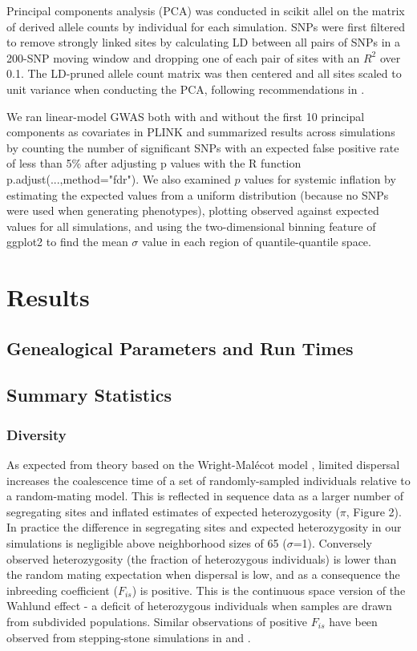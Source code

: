 \documentclass[9pt,twocolumn,twoside,lineno]{gsajnl}
\begin{document}
Principal components analysis (PCA) was conducted in scikit allel on the matrix of derived allele counts by individual for each simulation. SNPs were first filtered to remove strongly linked sites by calculating LD between all pairs of SNPs in a 200-SNP moving window and dropping one of each pair of sites with an $R^2$ over 0.1. The LD-pruned allele count matrix was then centered and all sites scaled to unit variance when conducting the PCA, following recommendations in \citep{Patterson2006}.   

We ran linear-model GWAS both with and without the first 10 principal components as covariates in PLINK and summarized results across simulations by counting the number of significant SNPs with an expected false positive rate of less than 5\% after adjusting p values with the R function p.adjust(...,method="fdr"). We also examined $p$ values for systemic inflation by estimating the expected values from a uniform distribution (because no SNPs were used when generating phenotypes), plotting observed against expected values for all simulations, and using the two-dimensional binning feature of ggplot2 \citep{Wickham2016} to find the mean $\sigma$ value in each region of quantile-quantile space. 

\section{Results}

\subsection{Genealogical Parameters and Run Times}

\subsection{Summary Statistics}
\subsubsection{Diversity}
As expected from theory based on the Wright-Malécot model \citep{Maruyama1972}, limited dispersal increases the coalescence time of a set of randomly-sampled individuals relative to a random-mating model. This is reflected in sequence data as a larger number of segregating sites and inflated estimates of expected heterozygosity ($\pi$, Figure 2). In practice the difference in segregating sites and expected heterozygosity in our simulations is negligible above neighborhood sizes of 65 ($\sigma$=1). Conversely observed heterozygosity (the fraction of heterozygous individuals) is lower than the random mating expectation when dispersal is low, and as a consequence the inbreeding coefficient ($F_{is}$) is positive. This is the continuous space version of the Wahlund effect \citep{Wahlund1928} - a deficit of heterozygous individuals when samples are drawn from subdivided populations. Similar observations of positive $F_{is}$ have been observed from stepping-stone simulations in \citep{Shirk2014} and \citep{Neel2013}.  
\end{document}
